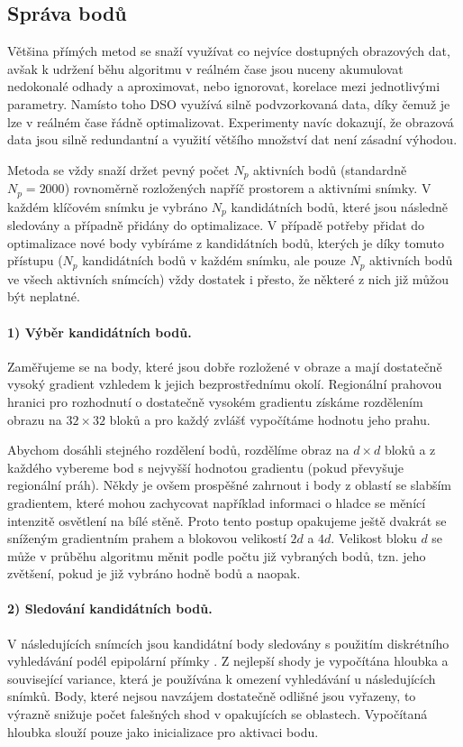 \documentclass[12pt,a4paper]{report}
\begin{document}
\subsection*{Správa bodů}
Většina přímých metod se snaží využívat co nejvíce dostupných obrazových dat, avšak k udržení běhu algoritmu v reálném čase jsou nuceny akumulovat nedokonalé odhady a aproximovat, nebo ignorovat, korelace mezi jednotlivými parametry. Namísto toho DSO využívá silně podvzorkovaná data, díky čemuž je lze v reálném čase řádně optimalizovat. Experimenty navíc dokazují, že obrazová data jsou silně redundantní a využití většího množství dat není zásadní výhodou. 

Metoda se vždy snaží držet pevný počet \( N_p \) aktivních bodů (standardně \( N_p = 2000 \)) rovnoměrně rozložených napříč prostorem a aktivními snímky. V každém klíčovém snímku je vybráno \( N_p \) kandidátních bodů, které jsou následně sledovány a případně přidány do optimalizace. V případě potřeby přidat do optimalizace nové body vybíráme z kandidátních bodů, kterých je díky tomuto přístupu (\( N_p \) kandidátních bodů v každém snímku, ale pouze \( N_p \) aktivních bodů ve všech aktivních snímcích) vždy dostatek i přesto, že některé z nich již můžou být neplatné.

\paragraph*{1) Výběr kandidátních bodů.} Zaměřujeme se na body, které jsou dobře rozložené v obraze a mají dostatečně vysoký gradient vzhledem k jejich bezprostřednímu okolí. Regionální prahovou hranici pro rozhodnutí o dostatečně vysokém gradientu získáme rozdělením obrazu na \( 32 \times 32 \) bloků a pro každý zvlášť vypočítáme hodnotu jeho prahu.

Abychom dosáhli stejného rozdělení bodů, rozdělíme obraz na \( d \times d \) bloků a z každého vybereme bod s nejvyšší hodnotou gradientu (pokud převyšuje regionální práh). Někdy je ovšem prospěšné zahrnout i body z oblastí se slabším gradientem, které mohou zachycovat například informaci o hladce se měnící intenzitě osvětlení na bílé stěně. Proto tento postup opakujeme ještě dvakrát se sníženým gradientním prahem a blokovou velikostí \( 2d \) a \( 4d \). Velikost bloku \( d \) se může v průběhu algoritmu měnit podle počtu již vybraných bodů, tzn. jeho zvětšení, pokud je již vybráno hodně bodů a naopak.

\paragraph*{2) Sledování kandidátních bodů.} V následujících snímcích jsou kandidátní body sledovány s použitím diskrétního vyhledávání podél epipolární přímky \cite{Engel2018_DSO}. Z nejlepší shody je vypočítána hloubka a související variance, která je používána k omezení vyhledávání u následujících snímků. Body, které nejsou navzájem dostatečně odlišné jsou vyřazeny, to výrazně snižuje počet falešných shod v opakujících se oblastech. Vypočítaná hloubka slouží pouze jako inicializace pro aktivaci bodu.
\end{document}
